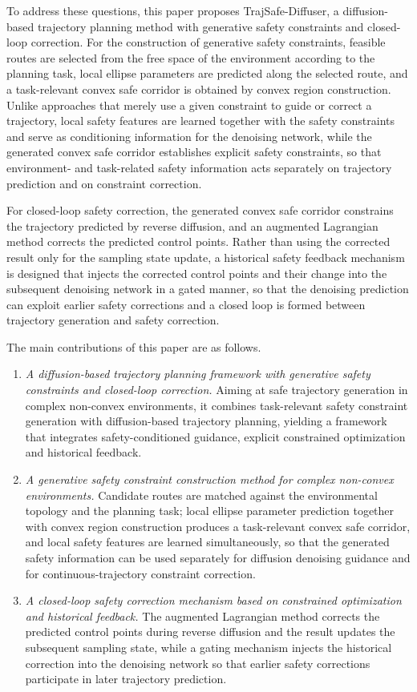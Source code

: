 \documentclass[journal]{IEEEtran}
\begin{document}
To address these questions, this paper proposes TrajSafe-Diffuser, a
diffusion-based trajectory planning method with generative safety constraints
and closed-loop correction. For the construction of generative safety
constraints, feasible routes are selected from the free space of the
environment according to the planning task, local ellipse parameters are
predicted along the selected route, and a task-relevant convex safe corridor is
obtained by convex region construction. Unlike approaches that merely use a
given constraint to guide or correct a trajectory, local safety features are
learned together with the safety constraints and serve as conditioning
information for the denoising network, while the generated convex safe corridor
establishes explicit safety constraints, so that environment- and task-related
safety information acts separately on trajectory prediction and on constraint
correction.

For closed-loop safety correction, the generated convex safe corridor
constrains the trajectory predicted by reverse diffusion, and an augmented
Lagrangian method corrects the predicted control points. Rather than using the
corrected result only for the sampling state update, a historical safety
feedback mechanism is designed that injects the corrected control points and
their change into the subsequent denoising network in a gated manner, so that
the denoising prediction can exploit earlier safety corrections and a closed
loop is formed between trajectory generation and safety correction.

The main contributions of this paper are as follows.
\begin{enumerate}
\item \emph{A diffusion-based trajectory planning framework with generative
safety constraints and closed-loop correction.} Aiming at safe trajectory
generation in complex non-convex environments, it combines task-relevant safety
constraint generation with diffusion-based trajectory planning, yielding a
framework that integrates safety-conditioned guidance, explicit constrained
optimization and historical feedback.

\item \emph{A generative safety constraint construction method for complex
non-convex environments.} Candidate routes are matched against the
environmental topology and the planning task; local ellipse parameter
prediction together with convex region construction produces a task-relevant
convex safe corridor, and local safety features are learned simultaneously, so
that the generated safety information can be used separately for diffusion
denoising guidance and for continuous-trajectory constraint correction.

\item \emph{A closed-loop safety correction mechanism based on constrained
optimization and historical feedback.} The augmented Lagrangian method corrects
the predicted control points during reverse diffusion and the result updates
the subsequent sampling state, while a gating mechanism injects the historical
correction into the denoising network so that earlier safety corrections
participate in later trajectory prediction.
\end{enumerate}
\end{document}
